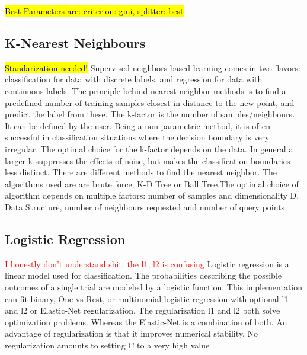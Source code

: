 \documentclass[11pt]{article}
\begin{document}
	\hl{Best Parameters are:  criterion: gini, splitter: best}

	
	\subsection{K-Nearest Neighbours}
	\hl{Standarization needed!}
	Supervised neighbors-based learning comes in two flavors: classification for data with discrete labels, and regression for data with continuous labels. The principle behind nearest neighbor methods is to find a predefined number of training samples closest in distance to the new point, and predict the label from these. The k-factor is the number of samples/neighbours. It can be defined by the user. Being a non-parametric method, it is often successful in classification situations where the decision boundary is very irregular. The optimal choice for the k-factor depends on the data. In general a larger k suppresses the effects of noise, but makes the classification boundaries less distinct. There are different methods to find the nearest neighbor. The algorithms used are are brute force, K-D Tree or Ball Tree.The optimal choice of algorithm depends on multiple factors: number of samples and dimensionality D, Data Structure, number of neighbours requested  and number of query points

	
	\subsection{Logistic Regression}
	\textcolor{red}{I honestly don't understand shit. the l1, l2 is confusing}
	\medbreak
	Logistic regression is a linear model used for classification. The probabilities describing the possible outcomes of a single trial are modeled by a logistic function. This implementation can fit binary, One-vs-Rest, or multinomial logistic regression with optional l1 and l2 or Elastic-Net regularization. The regularization l1 and l2 both solve optimization problems. Whereas the Elastic-Net is a combination of both. An advantage of regularization is that it improves numerical stability. No regularization amounts to setting C to a very high value

	
\end{document}
